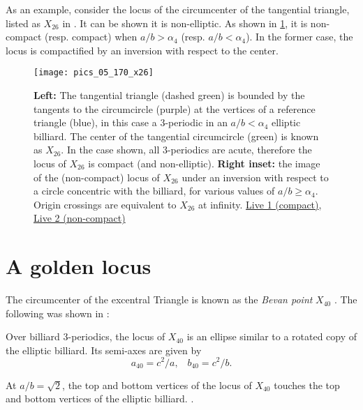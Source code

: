 As an example, consider the locus of the circumcenter of the tangential triangle, listed as $X_{26}$ in \cite{etc}. It can be shown it is non-elliptic. As shown in \cref{fig:05-locus-x26}, it is non-compact (resp. compact) when $a/b>\alpha_4$ (resp. $a/b<\alpha_4$). In the former case, the locus is compactified by an inversion with respect to the center.

\begin{figure}
    \centering
    \texttt{[image: pics\_05\_170\_x26]}
    \caption{\textbf{Left:} The tangential triangle (dashed green) is bounded by the tangents to the circumcircle (purple)  at the vertices of a reference triangle (blue), in this case a 3-periodic in an $a/b<\alpha_4$ elliptic billiard. The center of the tangential circumcircle (green) is known as $X_{26}$. In the case shown, all 3-periodics are acute, therefore the locus of $X_{26}$ is compact (and non-elliptic). \textbf{Right inset:} the image of the (non-compact) locus of $X_{26}$ under an inversion with respect to a circle concentric with the billiard, for various values of $a/b{\geq}\alpha_4$. Origin crossings are equivalent to $X_{26}$ at infinity. \href{https://bit.ly/3446TYF}{Live 1 (compact)}, \href{https://bit.ly/3hMiTpT}{Live 2 (non-compact)}}
    \label{fig:05-locus-x26}
\end{figure}


\section{A golden locus}

The circumcenter of the excentral Triangle is known as the {\em Bevan point} $X_{40}$ \cite{etc}. The following was shown in \cite{garcia2020-ellipses}:

\begin{proposition}
Over billiard 3-periodics, the locus of $X_{40}$ is an ellipse similar to a rotated copy of the elliptic billiard. Its semi-axes are given by 
%
\begin{equation*}
    a_{40}=c^2/a,\;\;\; b_{40}=c^2/b.
\end{equation*}
\end{proposition}

\begin{corollary}
At $a/b=\sqrt{2}$, the top and bottom vertices of the locus of $X_{40}$ touches the top and bottom vertices of the elliptic billiard.
\label{cor:05-x40-tangent}.
\end{corollary}


